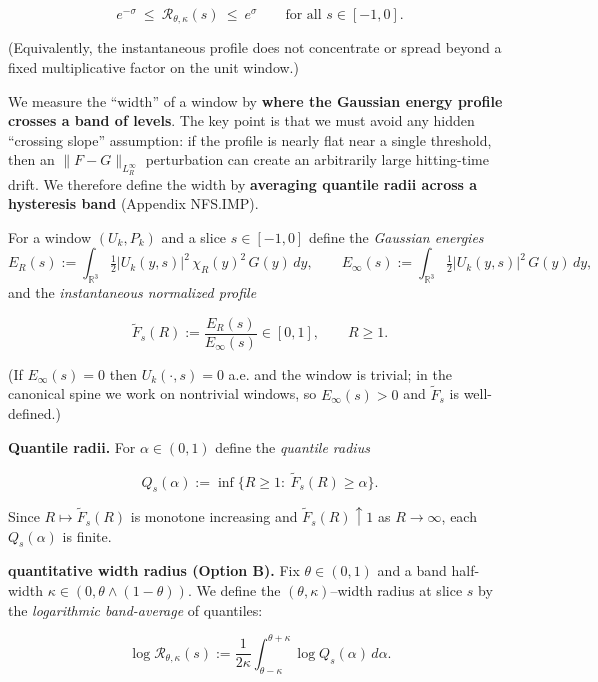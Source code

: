 \documentclass[
  11pt,
]{article}
\begin{document}
\begin{equation}
e^{-\sigma}\ \le\ \mathcal R_{\theta,\kappa}(s)\ \le\ e^{\sigma}
\qquad \text{for all }s\in[-1,0].
\tag{5.1}\label{def:5.1_breathing}
\end{equation}

(Equivalently, the instantaneous profile does not concentrate or spread beyond a fixed multiplicative factor on the unit window.)

We measure the ``width'' of a window by \textbf{where the Gaussian energy profile crosses a band of levels}. The key point is that we must avoid any hidden ``crossing slope'' assumption: if the profile is nearly flat near a single threshold, then an \(\|F-G\|_{L^\infty_R}\) perturbation can create an arbitrarily large hitting-time drift. We therefore define the width by \textbf{averaging quantile radii across a hysteresis band} (Appendix NFS.IMP).

For a window \((U_k,P_k)\) and a slice \(s\in[-1,0]\) define the \emph{Gaussian energies} \[
E_R(s):=\int_{\mathbb R^3} \tfrac12|U_k(y,s)|^2\,\chi_R(y)^2\,G(y)\,dy,
\qquad
E_\infty(s):=\int_{\mathbb R^3} \tfrac12|U_k(y,s)|^2\,G(y)\,dy,
\] and the \emph{instantaneous normalized profile}

\begin{equation}
\widetilde F_s(R):=\frac{E_R(s)}{E_\infty(s)}\in[0,1],
\qquad R\ge 1.
 \tag{5.0}
\end{equation}

(If \(E_\infty(s)=0\) then \(U_k(\cdot,s)=0\) a.e. and the window is trivial; in the canonical spine we work on nontrivial windows, so \(E_\infty(s)>0\) and \(\widetilde F_s\) is well-defined.)

\textbf{Quantile radii.} For \(\alpha\in(0,1)\) define the \emph{quantile radius}

\begin{equation}
Q_s(\alpha):=\inf\{R\ge 1:\ \widetilde F_s(R)\ge \alpha\}.
 \tag{5.1}
\end{equation}

Since \(R\mapsto\widetilde F_s(R)\) is monotone increasing and \(\widetilde F_s(R)\uparrow 1\) as \(R\to\infty\), each \(Q_s(\alpha)\) is finite.

\textbf{quantitative width radius (Option B).} Fix \(\theta\in(0,1)\) and a band half-width \(\kappa\in(0,\theta\wedge(1-\theta))\). We define the \((\theta,\kappa)\)--width radius at slice \(s\) by the \emph{logarithmic band-average} of quantiles:

\begin{equation}
\log \mathcal R_{\theta,\kappa}(s)
:=\frac{1}{2\kappa}\int_{\theta-\kappa}^{\theta+\kappa}\log Q_s(\alpha)\,d\alpha.
 \tag{5.2}\label{eq:5.2}
\end{equation}
\end{document}
